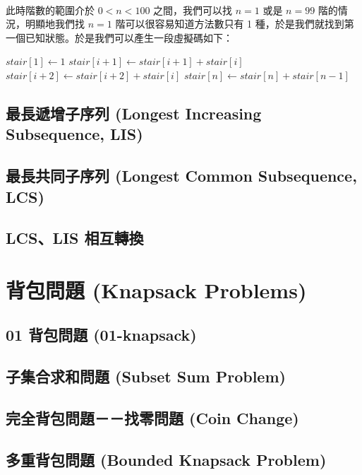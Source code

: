 \documentclass[12pt,a4paper,oneside]{report}
\begin{document}
\begin{CJK}{UTF8}{bkai}
\paragraph{}此時階數的範圍介於 $0<n<100$ 之間，我們可以找 $n=1$ 或是 $n=99$ 階的情況，明顯地我們找 $n=1$ 階可以很容易知道方法數只有 1 種，於是我們就找到第一個已知狀態。於是我們可以產生一段虛擬碼如下：

\begin{algorithm}
  \centering
  \begin{algorithmic}[1]
    \State $stair[1]\gets{1}$
      \State $stair[i+1]\gets{stair[i+1]+stair[i]}$
      \State $stair[i+2]\gets{stair[i+2]+stair[i]}$
    \EndFor
    \State $stair[n]\gets{stair[n]+stair[n-1]}$
  \EndProcedure
  \end{algorithmic}
\end{algorithm}

\subsection{最長遞增子序列 (Longest Increasing Subsequence, LIS)}
\subsection{最長共同子序列 (Longest Common Subsequence, LCS)}
\subsection{LCS、LIS 相互轉換}

\section{背包問題 (Knapsack Problems)}

\subsection{01 背包問題 (01-knapsack)}
\subsection{子集合求和問題 (Subset Sum Problem)}
\subsection{完全背包問題－－找零問題 (Coin Change)}
\subsection{多重背包問題 (Bounded Knapsack Problem)}

\end{CJK}
\end{document}

